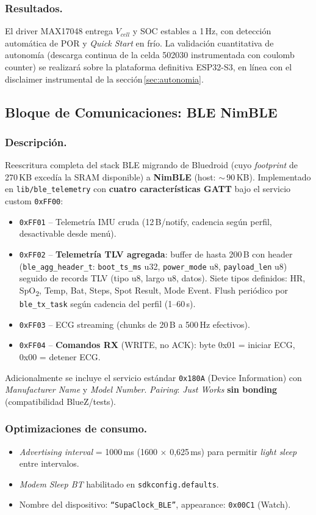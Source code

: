 \documentclass[letterpaper,11pt]{article}
\begin{document}
\subsubsection{Resultados.} El driver MAX17048 entrega $V_{cell}$ y SOC estables a 1\,Hz, con
detección automática de POR y \textit{Quick Start} en frío. La validación cuantitativa de
autonomía (descarga continua de la celda 502030 instrumentada con coulomb counter) se
realizará sobre la plataforma definitiva ESP32-S3, en línea con el disclaimer instrumental
de la sección\,\ref{sec:autonomia}.

\subsection{Bloque de Comunicaciones: BLE NimBLE}
\subsubsection{Descripción.} Reescritura completa del stack BLE migrando de Bluedroid (cuyo
\textit{footprint} de 270\,KB excedía la SRAM disponible) a \textbf{NimBLE} (host: $\sim$\,90\,KB).
Implementado en \texttt{lib/ble\_telemetry} con \textbf{cuatro características GATT} bajo el
servicio custom \texttt{0xFF00}:
\begin{itemize}
    \item \texttt{0xFF01} -- Telemetría IMU cruda (12\,B/notify, cadencia según perfil, desactivable desde menú).
    \item \texttt{0xFF02} -- \textbf{Telemetría TLV agregada}: buffer de hasta 200\,B con
    header (\texttt{ble\_agg\_header\_t}: \texttt{boot\_ts\_ms} u32, \texttt{power\_mode} u8,
    \texttt{payload\_len} u8) seguido de records TLV (tipo u8, largo u8, datos). Siete tipos
    definidos: HR, SpO\textsubscript{2}, Temp, Bat, Steps, Spot Result, Mode Event. Flush
    periódico por \texttt{ble\_tx\_task} según cadencia del perfil (1--60\,s).
    \item \texttt{0xFF03} -- ECG streaming (chunks de 20\,B a 500\,Hz efectivos).
    \item \texttt{0xFF04} -- \textbf{Comandos RX} (WRITE, no ACK): byte 0x01 = iniciar ECG,
    0x00 = detener ECG.
\end{itemize}
Adicionalmente se incluye el servicio estándar \texttt{0x180A} (Device Information) con
\textit{Manufacturer Name} y \textit{Model Number}. \textit{Pairing}: \textit{Just Works}
\textbf{sin bonding} (compatibilidad BlueZ/tests).

\subsubsection{Optimizaciones de consumo.}
\begin{itemize}
    \item \textit{Advertising interval} = 1000\,ms (1600 $\times$ 0,625\,ms) para permitir
    \textit{light sleep} entre intervalos.
    \item \textit{Modem Sleep BT} habilitado en \texttt{sdkconfig.defaults}.
    \item Nombre del dispositivo: \texttt{``SupaClock\_BLE''}, appearance: \texttt{0x00C1} (Watch).
\end{itemize}
\end{document}
